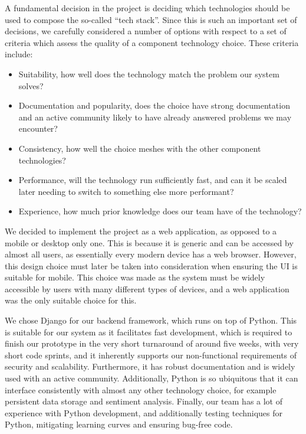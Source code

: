 \documentclass[10pt]{article}
\begin{document}
A fundamental decision in the project is deciding which technologies should be
used to compose the so-called “tech stack”. Since this is such an important set
of decisions, we carefully considered a number of options with respect to a set
of criteria which assess the quality of a component technology choice. These
criteria include:
\begin{itemize}
    \item
        Suitability, how well does the technology match the problem
        our system solves?
    \item
        Documentation and popularity, does the choice have strong
        documentation and an active community likely to have already answered problems
        we may encounter?
    \item
        Consistency, how well the choice meshes with the other
        component technologies?
    \item
        Performance, will the technology run sufficiently fast,
        and can it be scaled later needing to switch to something else more performant?
    \item
        Experience, how much prior knowledge does our team have of the technology?
\end{itemize}

We decided to implement the project as a web application, as opposed to a mobile or
desktop only one. This is because it is generic and can be accessed by almost
all users, as essentially every modern device has a web browser. However, this
design choice must later be taken into consideration when ensuring the UI is
suitable for mobile. This choice was made as the system must be widely
accessible by users with many different types of devices, and a web application
was the only suitable choice for this.

We chose Django for our backend framework, which runs on top of Python. This is
suitable for our system as it facilitates fast development, which is required to
finish our prototype in the very short turnaround of around five weeks, with
very short code sprints, and it inherently supports our non-functional
requirements of security and scalability. Furthermore, it has robust
documentation and is widely used with an active community. Additionally, Python
is so ubiquitous that it can interface consistently with almost any other
technology choice, for example persistent data storage and sentiment analysis.
Finally, our team has a lot of experience with Python development, and
additionally testing techniques for Python, mitigating learning curves and
ensuring bug-free code.
\end{document}
